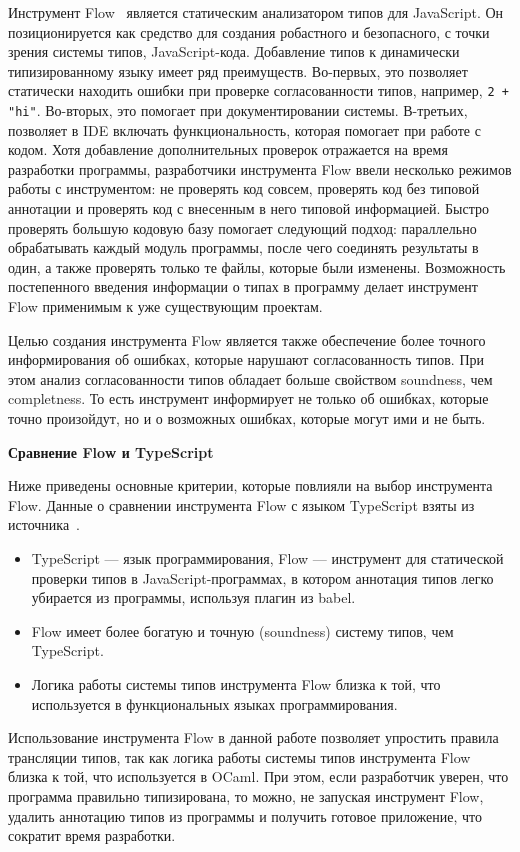\documentclass[12pt]{matmex-diploma}
\begin{document}
Инструмент Flow~\cite{flow} является статическим анализатором типов для JavaScript. Он позиционируется как средство для создания робастного и безопасного, с точки зрения системы типов, JavaScript-кода. Добавление типов к динамически типизированному языку имеет ряд преимуществ. Во-первых, это позволяет статически находить ошибки при проверке согласованности типов, например, \verb|2 + "hi"|. Во-вторых, это помогает при документировании системы. В-третьих, позволяет в IDE включать функциональность, которая помогает при работе с кодом. Хотя добавление дополнительных проверок отражается на время разработки программы, разработчики инструмента Flow ввели несколько режимов работы с инструментом: не проверять код совсем, проверять код без типовой аннотации и проверять код с внесенным в него типовой информацией. Быстро проверять большую кодовую базу помогает следующий подход: параллельно обрабатывать каждый модуль программы, после чего соединять результаты в один, а также проверять только те файлы, которые были изменены. Возможность постепенного введения информации о типах в программу делает инструмент Flow применимым к уже существующим проектам.

Целью создания инструмента Flow является также обеспечение более точного информирования об ошибках, которые нарушают согласованность типов. При этом анализ согласованности типов обладает больше свойством soundness, чем completness. То есть инструмент информирует не только об ошибках, которые точно произойдут, но и о возможных ошибках, которые могут ими и не быть. 

\textbf{Сравнение Flow и TypeScript}

Ниже приведены основные критерии, которые повлияли на выбор инструмента Flow. Данные о сравнении инструмента Flow с языком TypeScript взяты из источника~\cite{flowts}.

\begin{itemize}
    \item TypeScript --- язык программирования, Flow --- инструмент для статической проверки типов в JavaScript-программах, в котором аннотация типов легко убирается из программы, используя плагин из babel.
    \item Flow имеет более богатую и точную (soundness) систему типов, чем TypeScript.
    \item Логика работы системы типов инструмента Flow близка к той, что используется в функциональных языках программирования.
\end{itemize}

Использование инструмента Flow в данной работе позволяет упростить правила трансляции типов, так как логика работы системы типов инструмента Flow близка к той, что используется в OCaml. При этом, если разработчик уверен, что программа правильно типизирована, то можно, не запуская инструмент Flow, удалить аннотацию типов из программы и получить готовое приложение, что сократит время разработки.
\end{document}
